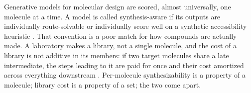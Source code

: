 \documentclass{article}
\begin{document}
%
%
%
%
%

Generative models for molecular design are scored, almost universally, one molecule at a time. A model is called synthesis-aware if its outputs are individually route-solvable or individually score well on a synthetic accessibility heuristic \citep{gao2020synthesizability,ertl2009sascore}. That convention is a poor match for how compounds are actually made. A laboratory makes a library, not a single molecule, and the cost of a library is not additive in its members: if two target molecules share a late intermediate, the steps leading to it are paid for once and their cost amortized across everything downstream \citep{fromer2024sparrow}. Per-molecule synthesizability is a property of a molecule; library cost is a property of a set; the two come apart.
\end{document}
